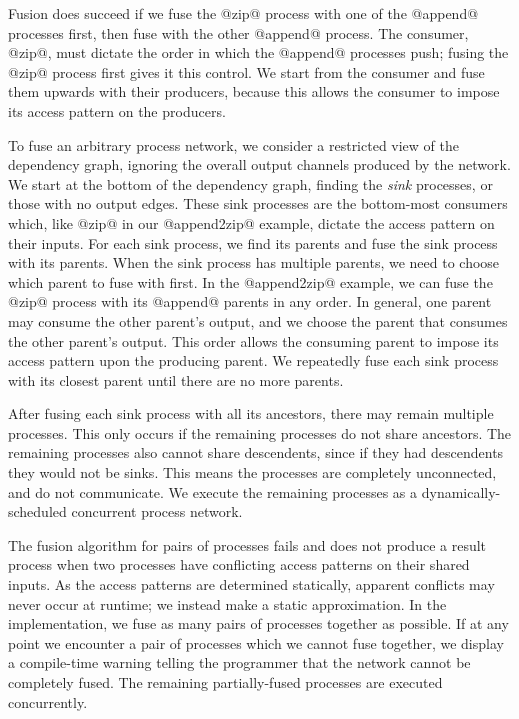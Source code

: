Fusion does succeed if we fuse the @zip@ process with one of the @append@ processes first, then fuse with the other @append@ process.
The consumer, @zip@, must dictate the order in which the @append@ processes push; fusing the @zip@ process first gives it this control.
We start from the consumer and fuse them upwards with their producers, because this allows the consumer to impose its access pattern on the producers.

To fuse an arbitrary process network, we consider a restricted view of the dependency graph, ignoring the overall output channels produced by the network.
We start at the bottom of the dependency graph, finding the \emph{sink} processes, or those with no output edges.
These sink processes are the bottom-most consumers which, like @zip@ in our @append2zip@ example, dictate the access pattern on their inputs.
For each sink process, we find its parents and fuse the sink process with its parents.
When the sink process has multiple parents, we need to choose which parent to fuse with first.
In the @append2zip@ example, we can fuse the @zip@ process with its @append@ parents in any order.
In general, one parent may consume the other parent's output, and we choose the parent that consumes the other parent's output.
This order allows the consuming parent to impose its access pattern upon the producing parent.
We repeatedly fuse each sink process with its closest parent until there are no more parents.

After fusing each sink process with all its ancestors, there may remain multiple processes.
This only occurs if the remaining processes do not share ancestors.
The remaining processes also cannot share descendents, since if they had descendents they would not be sinks.
This means the processes are completely unconnected, and do not communicate.
We execute the remaining processes as a dynamically-scheduled concurrent process network.

The fusion algorithm for pairs of processes fails and does not produce a result process when two processes have conflicting access patterns on their shared inputs.
As the access patterns are determined statically, apparent conflicts may never occur at runtime; we instead make a static approximation.
In the implementation, we fuse as many pairs of processes together as possible.
If at any point we encounter a pair of processes which we cannot fuse together, we display a compile-time warning telling the programmer that the network cannot be completely fused.
The remaining partially-fused processes are executed concurrently.

